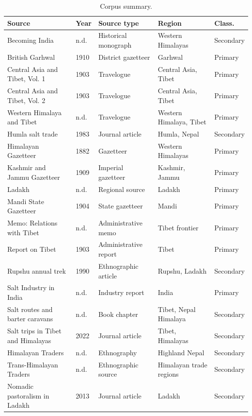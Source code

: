 
\begin{table}[htbp]
\centering
\caption{Corpus summary.}
\label{tab:corpus-summary}
\small
\begin{tabular}{lllll}
\hline
Source & Year & Source type & Region & Class. \\
\hline
Becoming India & n.d. & Historical monograph & Western Himalayas & Secondary \\
British Garhwal & 1910 & District gazetteer & Garhwal & Primary \\
Central Asia and Tibet, Vol. 1 & 1903 & Travelogue & Central Asia, Tibet & Primary \\
Central Asia and Tibet, Vol. 2 & 1903 & Travelogue & Central Asia, Tibet & Primary \\
Western Himalaya and Tibet & n.d. & Travelogue & Western Himalaya, Tibet & Primary \\
Humla salt trade & 1983 & Journal article & Humla, Nepal & Secondary \\
Himalayan Gazetteer & 1882 & Gazetteer & Western Himalayas & Primary \\
Kashmir and Jammu Gazetteer & 1909 & Imperial gazetteer & Kashmir, Jammu & Primary \\
Ladakh & n.d. & Regional source & Ladakh & Primary \\
Mandi State Gazetteer & 1904 & State gazetteer & Mandi & Primary \\
Memo: Relations with Tibet & n.d. & Administrative memo & Tibet frontier & Primary \\
Report on Tibet & 1903 & Administrative report & Tibet & Primary \\
Rupshu annual trek & 1990 & Ethnographic article & Rupshu, Ladakh & Secondary \\
Salt Industry in India & n.d. & Industry report & India & Primary \\
Salt routes and barter caravans & n.d. & Book chapter & Tibet, Nepal Himalaya & Secondary \\
Salt trips in Tibet and Himalayas & 2022 & Journal article & Tibet, Himalayas & Secondary \\
Himalayan Traders & n.d. & Ethnography & Highland Nepal & Secondary \\
Trans-Himalayan Traders & n.d. & Ethnographic source & Himalayan trade regions & Secondary \\
Nomadic pastoralism in Ladakh & 2013 & Journal article & Ladakh & Secondary \\
\hline
\end{tabular}
\end{table}

